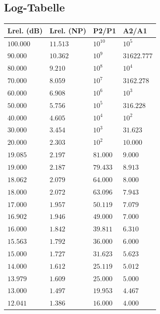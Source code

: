 \subsection{Log-Tabelle}\label{log_tabelle}
\begin{center}
	\parbox{7cm}{
		\scriptsize
		\begin{tabular}{l|l|l|l}
			\textbf{Lrel. (dB)} & \textbf{Lrel. (NP)} & \textbf{P2/P1} & \textbf{A2/A1} \\ \toprule
			$100.000$ & $11.513$ & $10^{10}$ & $10^5$ \\ \hline
			$90.000$ & $10.362$ & $10^9$ & $31622.777$ \\ \hline
			$80.000$ & $9.210$ & $10^8$ & $10^4$ \\ \hline
			$70.000$ & $8.059$ & $10^7$ & $3162.278$ \\ \hline
			$60.000$ & $6.908$ & $10^6$ & $10^3$ \\ \hline
			$50.000$ & $5.756$ & $10^5$ & $316.228$ \\ \hline
			$40.000$ & $4.605$ & $10^4$ & $10^2$ \\ \hline
			$30.000$ & $3.454$ & $10^3$ & $31.623$ \\ \hline
			\textbf{$20.000$} & $2.303$ & \textbf{$10^2$} & \textbf{$10.000$} \\ \hline
			$19.085$ & $2.197$ & $81.000$ & $9.000$ \\ \hline
			$19.000$ & $2.187$ & $79.433$ & $8.913$ \\ \hline
			$18.062$ & $2.079$ & $64.000$ & $8.000$ \\ \hline
			$18.000$ & $2.072$ & $63.096$ & $7.943$ \\ \hline
			$17.000$ & $1.957$ & $50.119$ & $7.079$ \\ \hline
			$16.902$ & $1.946$ & $49.000$ & $7.000$ \\ \hline
			$16.000$ & $1.842$ & $39.811$ & $6.310$ \\ \hline
			$15.563$ & $1.792$ & $36.000$ & $6.000$ \\ \hline
			$15.000$ & $1.727$ & $31.623$ & $5.623$ \\ \hline
			$14.000$ & $1.612$ & $25.119$ & $5.012$ \\ \hline
			\textbf{$13.979$} & $1.609$ & \textbf{$25.000$} & \textbf{$5.000$} \\ \hline
			$13.000$ & $1.497$ & $19.953$ & $4.467$ \\ \hline
			\textbf{$12.041$} & $1.386$ & \textbf{$16.000$} & \textbf{$4.000$} \\ \hline

\end{tabular}}
\end{center}
